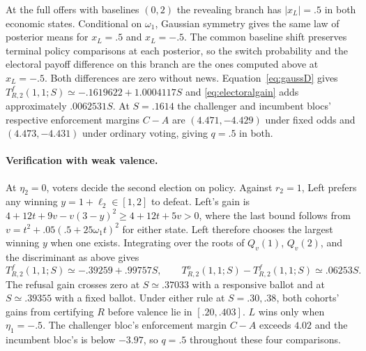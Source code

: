 \documentclass[11pt,letterpaper]{article}
\begin{document}
At the full offers with baselines $(0,2)$ the revealing branch has $|x_L|=.5$ in both economic states. Conditional on $\omega_1$, Gaussian symmetry gives the same law of posterior means for $x_L=.5$ and $x_L=-.5$. The common baseline shift preserves terminal policy comparisons at each posterior, so the switch probability and the electoral payoff difference on this branch are the ones computed above at $x_L=-.5$. Both differences are zero without news. Equation~\eqref{eq:gaussD} gives $T^f_{R,2}(1,1;S)\simeq-.1619622+1.0004117S$ and \eqref{eq:electoralgain} adds approximately $.0062531S$. At $S=.1614$ the challenger and incumbent blocs' respective enforcement margins $C-A$ are $(4.471,-4.429)$ under fixed odds and $(4.473,-4.431)$ under ordinary voting, giving $q=.5$ in both.

\paragraph{Verification with weak valence.}
At $\eta_2=0$, voters decide the second election on policy. Against $r_2=1$, Left prefers any winning $y=1+\ell_2\in[1,2]$ to defeat. Left's gain is $4+12t+9v-v(3-y)^2\ge 4+12t+5v>0$, where the last bound follows from $v=t^2+.05(.5+25\omega_1t)^2$ for either state. Left therefore chooses the largest winning $y$ when one exists. Integrating over the roots of $Q_v(1)$, $Q_v(2)$, and the discriminant as above gives
\[
 T_{R,2}^f(1,1;S)\simeq-.39259+.99757S,\qquad
 T_{R,2}^o(1,1;S)-T_{R,2}^f(1,1;S)\simeq .06253S .
\]
The refusal gain crosses zero at $S\simeq .37033$ with a responsive ballot and at $S\simeq .39355$ with a fixed ballot. Under either rule at $S=.30,.38$, both cohorts' gains from certifying $R$ before valence lie in $[.20,.403]$. $L$ wins only when $\eta_1=-.5$. The challenger bloc's enforcement margin $C-A$ exceeds $4.02$ and the incumbent bloc's is below $-3.97$, so $q=.5$ throughout these four comparisons.
\end{document}
